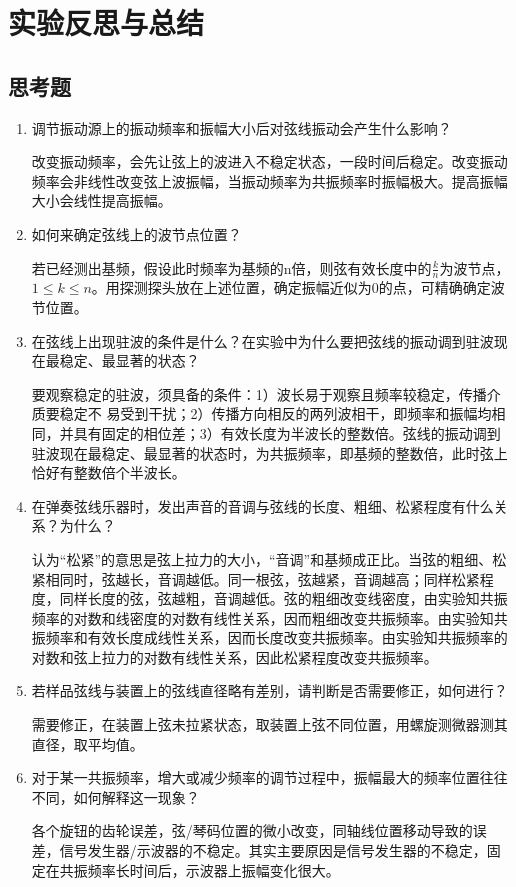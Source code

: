 \documentclass[11pt]{article}
\begin{document}
\section{实验反思与总结}
\subsection{思考题}
\begin{enumerate}
    \item 调节振动源上的振动频率和振幅大小后对弦线振动会产生什么影响？
    \par \hspace*{2em}改变振动频率，会先让弦上的波进入不稳定状态，一段时间后稳定。改变振动频率会非线性改变弦上波振幅，当振动频率为共振频率时振幅极大。提高振幅大小会线性提高振幅。
    \item 如何来确定弦线上的波节点位置？
    \par \hspace*{2em}若已经测出基频，假设此时频率为基频的n倍，则弦有效长度中的$\frac{k}{n}$为波节点，$1\leq k\leq n$。用探测探头放在上述位置，确定振幅近似为0的点，可精确确定波节位置。
    \item 在弦线上出现驻波的条件是什么？在实验中为什么要把弦线的振动调到驻波现在最稳定、最显著的状态？
    \par \hspace*{2em}要观察稳定的驻波，须具备的条件：1）波长易于观察且频率较稳定，传播介质要稳定不
    易受到干扰；2）传播方向相反的两列波相干，即频率和振幅均相同，并具有固定的相位差；3）有效长度为半波长的整数倍。弦线的振动调到驻波现在最稳定、最显著的状态时，为共振频率，即基频的整数倍，此时弦上恰好有整数倍个半波长。
    \item 在弹奏弦线乐器时，发出声音的音调与弦线的长度、粗细、松紧程度有什么关系？为什么？
    \par \hspace*{2em}认为“松紧”的意思是弦上拉力的大小，“音调”和基频成正比。当弦的粗细、松紧相同时，弦越长，音调越低。同一根弦，弦越紧，音调越高；同样松紧程度，同样长度的弦，弦越粗，音调越低。弦的粗细改变线密度，由实验知共振频率的对数和线密度的对数有线性关系，因而粗细改变共振频率。由实验知共振频率和有效长度成线性关系，因而长度改变共振频率。由实验知共振频率的对数和弦上拉力的对数有线性关系，因此松紧程度改变共振频率。
    \item 若样品弦线与装置上的弦线直径略有差别，请判断是否需要修正，如何进行？
    \par \hspace*{2em}需要修正，在装置上弦未拉紧状态，取装置上弦不同位置，用螺旋测微器测其直径，取平均值。
    \item 对于某一共振频率，增大或减少频率的调节过程中，振幅最大的频率位置往往不同，如何解释这一现象？
    \par \hspace*{2em}各个旋钮的齿轮误差，弦/琴码位置的微小改变，同轴线位置移动导致的误差，信号发生器/示波器的不稳定。其实主要原因是信号发生器的不稳定，固定在共振频率长时间后，示波器上振幅变化很大。
\end{enumerate}
\end{document}
